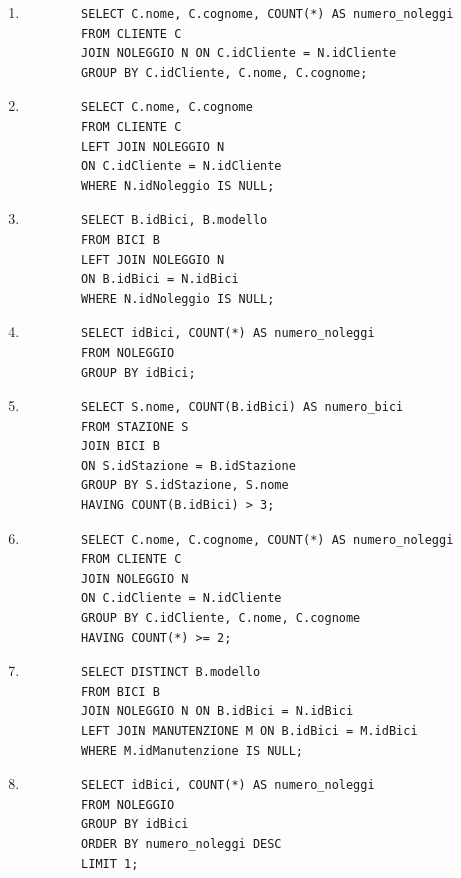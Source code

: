 \documentclass[a4paper,12pt]{article}
\begin{document}
\begin{enumerate}
	\item
	\begin{verbatim}
		SELECT C.nome, C.cognome, COUNT(*) AS numero_noleggi
		FROM CLIENTE C
		JOIN NOLEGGIO N ON C.idCliente = N.idCliente
		GROUP BY C.idCliente, C.nome, C.cognome;
	\end{verbatim}
	
	\item
	\begin{verbatim}
		SELECT C.nome, C.cognome
		FROM CLIENTE C
		LEFT JOIN NOLEGGIO N
		ON C.idCliente = N.idCliente
		WHERE N.idNoleggio IS NULL;
	\end{verbatim}
	
	\item
	\begin{verbatim}
		SELECT B.idBici, B.modello
		FROM BICI B
		LEFT JOIN NOLEGGIO N
		ON B.idBici = N.idBici
		WHERE N.idNoleggio IS NULL;
	\end{verbatim}
	
	\item
	\begin{verbatim}
		SELECT idBici, COUNT(*) AS numero_noleggi
		FROM NOLEGGIO
		GROUP BY idBici;
	\end{verbatim}
	
	\item
	\begin{verbatim}
		SELECT S.nome, COUNT(B.idBici) AS numero_bici
		FROM STAZIONE S
		JOIN BICI B
		ON S.idStazione = B.idStazione
		GROUP BY S.idStazione, S.nome
		HAVING COUNT(B.idBici) > 3;
	\end{verbatim}
	
	\item
	\begin{verbatim}
		SELECT C.nome, C.cognome, COUNT(*) AS numero_noleggi
		FROM CLIENTE C
		JOIN NOLEGGIO N
		ON C.idCliente = N.idCliente
		GROUP BY C.idCliente, C.nome, C.cognome
		HAVING COUNT(*) >= 2;
	\end{verbatim}
	
	\item
	\begin{verbatim}
		SELECT DISTINCT B.modello
		FROM BICI B
		JOIN NOLEGGIO N ON B.idBici = N.idBici
		LEFT JOIN MANUTENZIONE M ON B.idBici = M.idBici
		WHERE M.idManutenzione IS NULL;
	\end{verbatim}
	
	\item
	\begin{verbatim}
		SELECT idBici, COUNT(*) AS numero_noleggi
		FROM NOLEGGIO
		GROUP BY idBici
		ORDER BY numero_noleggi DESC
		LIMIT 1;
	\end{verbatim}
	
\end{enumerate}
\end{document}

